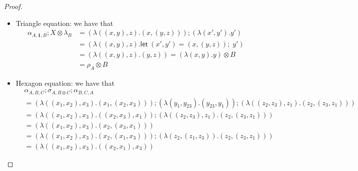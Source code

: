 \documentclass[acmsmall,screen,anonymous,review]{acmart}
\newcommand{\mb}[1]{\ensuremath{\mathbf{#1}}}
\newcommand{\ms}[1]{\ensuremath{\mathsf{#1}}}
\newcommand{\letexpr}[3]{\ensuremath{\ms{let}\;#1 = #2;\;#3}}
\begin{document}
\begin{proof}
\begin{itemize}
\begin{itemize}
\begin{align*}
      \\
      &= (\lambda (((x_1, x_2), x_3), x_4) . (x_1, ((x_2, x_3), x_4))) ;
      (\lambda (z_1, ((z_2, z_3), z_4)) . (z_1, (z_2, (z_3, z_4))))
      \\
      &= (\lambda (((x_1, x_2), x_3), x_4) . 
        \letexpr{((y_1, y_{23}), y_4)}{((x_1, (x_2, x_3)), x_4)}{(y_1, (y_{23}, y_4))}) ; 
        \\ & \qquad 
      (\lambda (z_1, ((z_2, z_3), z_4)) . (z_1, (z_2, (z_3, z_4))))
      \\
      &= (\lambda (((x_1, x_2), x_3), x_4) . ((x_1, (x_2, x_3)), x_4)) ; 
      (\lambda ((y_1, y_{23}), y_4) . (y_1, (y_{23}, y_4))) ; \\ & \qquad 
      (\lambda (z_1, ((z_2, z_3), z_4)) . (z_1, (z_2, (z_3, z_4))))
      \\
      &= \alpha_{A, B, C} \otimes D ; \alpha_{A, B \otimes C, D} ; A \otimes \alpha_{B, C, D}
    \end{align*}
    \item Triangle equation: we have that
    \begin{align*}
      \alpha_{A, \mb{1}, B} ; X \otimes \lambda_B
      &= (\lambda ((x, y), z) . (x, (y, z))) ; (\lambda (x', y') . y') \\
      &= (\lambda ((x, y), z) . \letexpr{(x', y')}{(x, (y, z))}{y'}) \\
      &= (\lambda ((x, y), z) . (y, z)) 
        = (\lambda (x, y) . y) \otimes B
        \\
      &= \rho_A \otimes B
    \end{align*}
    \item Hexagon equation: we have that
    \begin{align*}
      &\alpha_{A, B, C} ; \sigma_{A, B \otimes C} ; \alpha_{B, C, A} \\
      &= (\lambda ((x_1, x_2), x_3) . (x_1, (x_2, x_3))) 
        ; (\lambda (y_1, y_{23}) . (y_{23}, y_1))
        ; (\lambda ((z_2, z_3), z_1) . (z_2, (z_3, z_1)))
      \\
      &= (\lambda ((x_1, x_2), x_3) . ((x_2, x_3), x_1)) 
        ;  (\lambda ((z_2, z_3), z_1) . (z_2, (z_3, z_1))) 
      \\
      &= (\lambda ((x_1, x_2), x_3) . (x_2, (x_3, x_1))) \\
      &= (\lambda ((x_1, x_2), x_3) . (x_2, (x_1, x_3)))
        ; (\lambda (z_2, (z_1, z_3)) . (z_2, (z_3, z_1)))
      \\
      &= (\lambda ((x_1, x_2), x_3) . ((x_2, x_1), x_3)) 

\end{align*}
\end{itemize}
\end{itemize}
\end{proof}
\end{document}

